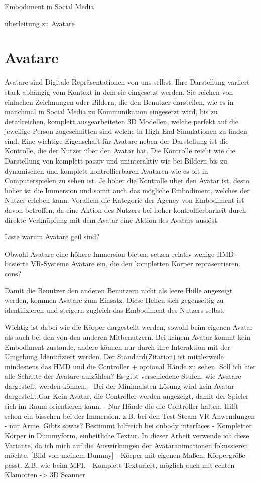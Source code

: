 Embodiment in Social Media
\cite{Schwartz2018}

überleitung zu Avatare



\section{Avatare}
Avatare sind Digitale Repräsentationen von uns selbst. Ihre Darstellung variiert stark abhängig vom Kontext in dem sie eingesetzt werden. Sie reichen von einfachen Zeichnungen oder Bildern, die den Benutzer darstellen, wie es in manchmal in Social Media zu Kommunikation eingesetzt wird, bis zu detailreichen, komplett ausgearbeiteten 3D Modellen, welche perfekt auf die jeweilige Person zugeschnitten sind welche in High-End Simulationen zu finden sind.
Eine wichtige Eigenschaft für Avatare neben der Darstellung ist die Kontrolle, die der Nutzer über den Avatar hat. Die Kontrolle reicht wie die Darstellung von komplett passiv und uninteraktiv wie bei Bildern bis zu dynamischen und komplett kontrollierbaren Avataren wie es oft in Computerspielen zu sehen ist.
Je höher die Kontrolle über den Avatar ist, desto höher ist die Immersion und somit auch das mögliche Embodiment, welches der Nutzer erleben kann. Vorallem die Kategorie der Agency von Embodiment ist davon betroffen, da eine Aktion des Nutzers bei hoher kontrollierbarkeit durch direkte Verknüpfung mit dem Avatar eine Aktion des Avatars auslöst.\cite{Biocca2014}

Liste warum Avatare geil sind?



Obwohl Avatare eine höhere Immersion bieten, setzen relativ wenige HMD-basierte VR-Systeme Avatare ein, die den kompletten Körper repräsentieren.\cite{Pan2017} cons?



Damit die Benutzer den anderen Benutzern nicht als leere Hülle angezeigt werden, kommen Avatare zum Einsatz. Diese Helfen sich gegenseitig zu identifizieren und steigern zugleich das Embodiment des Nutzers selbst. 

Wichtig ist dabei wie die Körper dargestellt werden, sowohl beim eigenen Avatar als auch bei den von den anderen Mitbenutzern. Bei keinem Avatar kommt kein Embodiment zustande, andere können nur durch ihre Interaktion mit der Umgebung Identifiziert werden. Der Standard(Zitation) ist mittlerweile mindestens das HMD und die Controller + optional Hände zu sehen. \cite{Benford2010}
Soll ich hier alle Schritte der Avatare aufzählen?
Es gibt verschiedene Stufen, wie Avatare dargestellt werden können.
- Bei der Minimalsten Lösung wird kein Avatar dargestellt.Gar Kein Avatar, die Controller werden angezeigt, damit der Spieler sich im Raum orientieren kann.
- Nur Hände die die Controller halten. Hilft schon ein bisschen bei der Immersion. z.B. bei den Test Steam VR Anwendungen
- nur Arme. Gibts sowas? Bestimmt hilfreich bei onbody interfaces
- Kompletter Körper in Dummyform, einheitliche Textur. In dieser Arbeit verwende ich diese Variante, da ich mich auf die Auswirkungen der Avataranimationen fokussieren möchte. 
[Bild von meinem Dummy]
- Körper mit eigenen Maßen, Körpergröße passt. Z.B. wie beim MPI. 
- Komplett Texturiert, möglich auch mit echten Klamotten -> 3D Scanner

